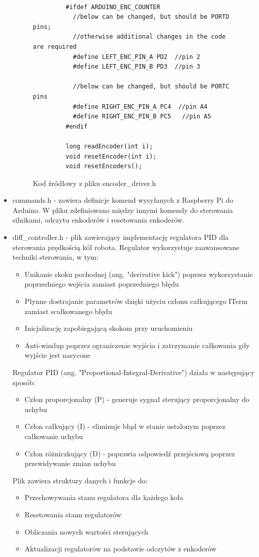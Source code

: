 \documentclass[a4paper,twoside,12pt]{book}
\begin{document}
\begin{itemize}
\begin{figure}[!hb]
\begin{lstlisting}
			
		 #ifdef ARDUINO_ENC_COUNTER
		   //below can be changed, but should be PORTD pins; 
		   //otherwise additional changes in the code are required
		   #define LEFT_ENC_PIN_A PD2  //pin 2
		   #define LEFT_ENC_PIN_B PD3  //pin 3
		   
		   //below can be changed, but should be PORTC pins
		   #define RIGHT_ENC_PIN_A PC4  //pin A4
		   #define RIGHT_ENC_PIN_B PC5   //pin A5
		 #endif
			
		 long readEncoder(int i);
		 void resetEncoder(int i);
		 void resetEncoders();
			\end{lstlisting}
			\caption{Kod źródłowy z pliku encoder\_driver.h}
			\label{fig:encoder-driver}
			\end{figure}
			
			\item commands.h - zawiera definicje komend wysyłanych z Raspberry Pi do Arduino. W pliku zdefiniowano między innymi komendy do sterowania silnikami, odczytu enkoderów i resetowania enkoderów.
			\item diff\_controller.h - plik zawierający implementację regulatora PID dla sterowania prędkością kół robota. Regulator wykorzystuje zaawansowane techniki sterowania, w tym:

			\begin{itemize}
				\item Unikanie skoku pochodnej (ang. "derivative kick") poprzez wykorzystanie poprzedniego wejścia zamiast poprzedniego błędu
				\item Płynne dostrajanie parametrów dzięki użyciu członu całkującego ITerm zamiast scałkowanego błędu
				\item Inicjalizację zapobiegającą skokom przy uruchomieniu
				\item Anti-windup poprzez ograniczenie wyjścia i zatrzymanie całkowania gdy wyjście jest nasycone
			\end{itemize}

			Regulator PID (ang. "Proportional-Integral-Derivative") działa w następujący sposób:
			\begin{itemize}
				\item Człon proporcjonalny (P) - generuje sygnał sterujący proporcjonalny do uchybu
				\item Człon całkujący (I) - eliminuje błąd w stanie ustalonym poprzez całkowanie uchybu
				\item Człon różniczkujący (D) - poprawia odpowiedź przejściową poprzez przewidywanie zmian uchybu
			\end{itemize}

			Plik zawiera struktury danych i funkcje do:
			\begin{itemize}
				\item Przechowywania stanu regulatora dla każdego koła
				\item Resetowania stanu regulatorów
				\item Obliczania nowych wartości sterujących
				\item Aktualizacji regulatorów na podstawie odczytów z enkoderów
			\end{itemize}
			
\end{itemize}
 
\end{document}
